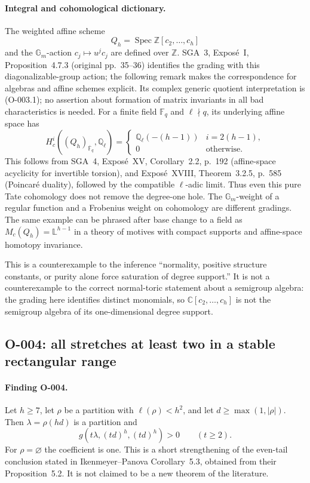 \paragraph{Integral and cohomological dictionary.}
The weighted affine scheme
\[
       Q_h=\operatorname{Spec}\mathbb Z[c_2,\ldots,c_h]
\]
and the $\mathbb G_m$-action $c_j\mapsto u^jc_j$ are defined over
$\mathbb Z$. SGA~3, Expos\'e~I, Proposition~4.7.3 (original pp.~35--36)
identifies the grading with this diagonalizable-group action; the
following remark makes the correspondence for algebras and affine
schemes explicit. Its complex generic quotient interpretation is
(O-003.1); no assertion about formation of matrix invariants in all bad
characteristics is needed. For a finite field $\mathbb F_q$ and
$\ell\nmid q$, its underlying affine space has
\[
 H_c^i((Q_h)_{\overline{\mathbb F}_q},\mathbb Q_\ell)=
 \begin{cases}\mathbb Q_\ell(-(h-1))&i=2(h-1),\\0&\text{otherwise}.
 \end{cases}
\]
This follows from SGA~4, Expos\'e~XV, Corollary~2.2, p.~192
(affine-space acyclicity for invertible torsion), and
Expos\'e~XVIII, Theorem~3.2.5, p.~585 (Poincar\'e duality),
followed by the compatible $\ell$-adic limit.
Thus even this pure Tate cohomology does not remove the degree-one hole.
The $\mathbb G_m$-weight of a regular function and a Frobenius weight
on cohomology are different gradings. The same example can be phrased
after base change to a field as $M_c(Q_h)=\mathbb L^{h-1}$ in a
theory of motives with compact supports and affine-space homotopy
invariance.

This is a counterexample to the inference ``normality, positive
structure constants, or purity alone force saturation of degree
support.'' It is not a counterexample to the correct normal-toric
statement about a semigroup algebra: the grading here identifies
distinct monomials, so $\mathbb C[c_2,\ldots,c_h]$ is not the semigroup
algebra of its one-dimensional degree support.

\subsection{O-004: all stretches at least two in a stable rectangular range}

\paragraph{Finding O-004.}
Let $h\geq7$, let $\rho$ be a partition with $\ell(\rho)<h^2$, and
let $d\geq\max(1,|\rho|)$.  Then $\lambda=\rho(hd)$ is a partition and
\[
          g(t\lambda,(td)^h,(td)^h)>0\qquad(t\geq2).       \tag{O-004.1}
\]
For $\rho=\varnothing$ the coefficient is one.  This is a short
strengthening of the even-tail conclusion stated in
Ikenmeyer--Panova Corollary~5.3, obtained from their
Proposition~5.2.  It is not claimed to be a new theorem of the literature.

